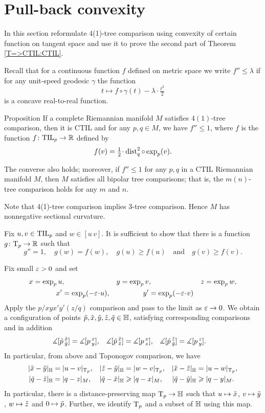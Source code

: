 \section{Pull-back convexity}\label{convexity}

In this section reformulate 4(1)-tree comparison using convexity of certain function on tangent space and use it to prove the second part of Theorem \ref{T=>CTIL:CTIL}.

Recall that for a continuous function $f$ defined on metric space we write 
$f''\le \lambda$ if for any unit-speed geodesic $\gamma$ the function
\[t\mapsto f\circ\gamma(t)-\lambda\cdot \tfrac{t^2}{2}\]
is a concave real-to-real function.

\begin{thm}{Proposition}\label{prop:convexity}
If a complete Riemannian manifold $M$ satisfies $4(1)$-tree comparison, then it is CTIL and for any $p,q\in M$, we have $f''\le 1$, where $f$ is the function $f\: \TIL_p\to \RR$ defined by
\[f(v)=\tfrac12\cdot\dist_q^2\circ\exp_p(v).\] 

The converse also holds; moreover, if $f''\le 1$ for any $p,q$ in a CTIL Riemannian manifold $M$, then $M$ satisfies all bipolar tree comparisons; that is, the $m(n)$-tree comparison holds for any $m$ and $n$.
\end{thm}

Note that 4(1)-tree comparison implies 3-tree comparison.
Hence $M$ has nonnegative sectional curvature.

Fix $u,v\in \TIL_p$ and $w\in [u\,v]$.
It is sufficient to show that there is a function $g\:\T_p\to \RR$ such that
\[g''=1,\quad
g(w)=f(w),\quad
g(u)\ge f(u)\quad
\text{and}\quad
g(v)\ge f(v).\]

Fix small $\eps>0$ and set
\begin{align*}
x=\exp_p u&,
&y=\exp_p v&, 
&z=\exp_pw&,
\\
x'&=\exp_p(-\eps\cdot  u),
&y'&=\exp_p(-\eps\cdot  v)
\end{align*}
Apply the $p/xyx'y'(z/q)$ comparison and pass to the limit as $\eps\to 0$.
We obtain a configuration of points $\~p, \~x, \~y, \~z, \~q\in\HH$, satisfying corresponding comparisons and
in addition
\begin{align*}
\measuredangle[\~p\,^{\~x}_{\~y}]&= \measuredangle[p\,^{x}_{y}],
&\measuredangle[\~p\,^{\~x}_{\~z}]&= \measuredangle[p\,^{x}_{z}],
&\measuredangle[\~p\,^{\~z}_{\~y}]&= \measuredangle[p\,^{z}_{y}].
\end{align*}
In particular,
from above and Toponogov comparison, we have
\begin{align*}
|\~x-\~y|_\HH&=|u-v|_{\T_p},
&|\~z-\~y|_\HH&=|w-v|_{\T_p},
&|\~x-\~z|_\HH&=|u-w|_{\T_p},
\\
|\~q-\~z|_\HH&=|q-z|_M,
&|\~q-\~x|_\HH&\ge|q-x|_M,
&|\~q-\~y|_\HH&\ge|q-y|_M.
\end{align*}
In particular, there is a distance-preserving map $\T_p\to \HH$ 
such that $u\mapsto \~x$, $v\mapsto \~y$, $w\mapsto \~z$ and $0\mapsto \~p$.
Further, we identify $\T_p$ and a subset of $\HH$ using this map.


